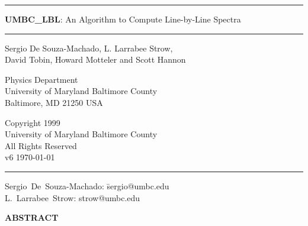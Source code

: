 \documentclass[11pt]{article}
\newcommand{\HRule}{\rule{\linewidth}{1mm}}
\newcommand{\HRulethin}{\rule{\linewidth}{0.5mm}}
\begin{document}
\thispagestyle{empty}
\vspace{2.0in}

\noindent\HRule
\begin{center}
\Huge \textbf{\textsf{UMBC\_LBL}}: An Algorithm to Compute Line-by-Line 
Spectra
\end{center}
\noindent\HRule

\vspace{0.75in}
\begin{center}
\begin{Large}
Sergio De Souza-Machado, L. Larrabee Strow,\\ David Tobin, Howard Motteler 
and Scott Hannon
\end{Large}
\end{center}

\vspace{0.5in}
\begin{center}
Physics Department\\
University of Maryland Baltimore County\\Baltimore, MD 21250 USA\\
\end{center}

\vspace{0.5in}
\begin{center}
Copyright 1999 \\
University of Maryland Baltimore County \\
All Rights Reserved\\
v6  \today\\
\end{center}

\vfill

\noindent\HRulethin
\begin{flushleft}
\begin{tabbing}
Sergio~De~Souza-Machado: \=    sergio@umbc.edu \\
L.~Larrabee~Strow:   \>        strow@umbc.edu\\
\end{tabbing}
\end{flushleft}


\newpage
\tableofcontents
\listoftables
\listoffigures

\newpage

\begin{center}
{\bf ABSTRACT}
\end{center}
\end{document}
